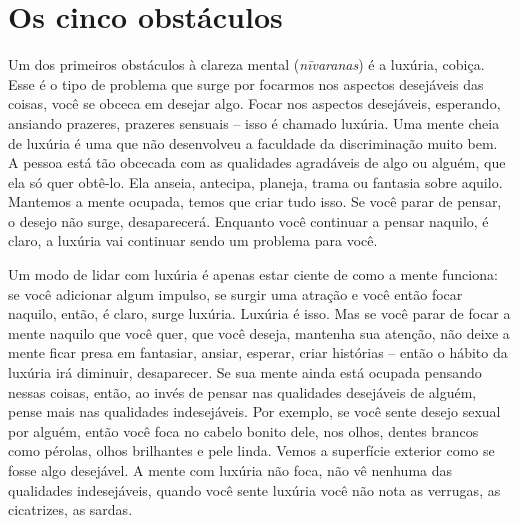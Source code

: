 
\chapter{Os cinco obstáculos}
\markright{\theChapterAuthor}

Um dos primeiros obstáculos à clareza mental (\textit{nīvaranas})
é a luxúria, cobiça. Esse é o tipo de problema que surge por focarmos
nos aspectos desejáveis das coisas, você se obceca em desejar algo.
Focar nos aspectos desejáveis, esperando, ansiando prazeres, prazeres
sensuais – isso é chamado luxúria. Uma mente cheia de luxúria é uma que
não desenvolveu a faculdade da discriminação muito bem. A pessoa está
tão obcecada com as qualidades agradáveis de algo ou alguém, que ela só
quer obtê-lo. Ela anseia, antecipa, planeja, trama ou fantasia sobre
aquilo. Mantemos a mente ocupada, temos que criar tudo isso. Se você
parar de pensar, o desejo não surge, desaparecerá. Enquanto você
continuar a pensar naquilo, é claro, a luxúria vai continuar sendo um
problema para você. 

Um modo de lidar com luxúria é apenas estar ciente de como a mente
funciona: se você adicionar algum impulso, se surgir uma atração e você
então focar naquilo, então, é claro, surge luxúria. Luxúria é isso. Mas
se você parar de focar a mente naquilo que você quer, que você deseja,
mantenha sua atenção, não deixe a mente ficar presa em fantasiar,
ansiar, esperar, criar histórias – então o hábito da luxúria irá
diminuir, desaparecer. Se sua mente ainda está ocupada pensando nessas
coisas, então, ao invés de pensar nas qualidades desejáveis de alguém,
pense mais nas qualidades indesejáveis. Por exemplo, se você sente
desejo sexual por alguém, então você foca no cabelo bonito dele, nos
olhos, dentes brancos como pérolas, olhos brilhantes e pele linda.
Vemos a superfície exterior como se fosse algo desejável. A mente com
luxúria não foca, não vê nenhuma das qualidades indesejáveis, quando
você sente luxúria você não nota as verrugas, as cicatrizes, as sardas.


